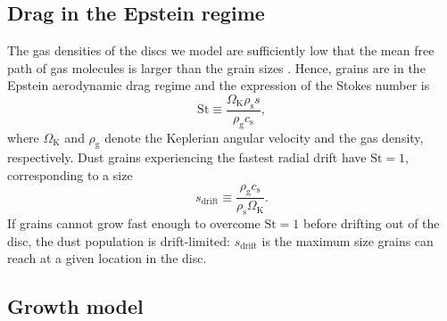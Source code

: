 \documentclass[a4paper,fleqn,usenatbib]{mnras}
\newcommand{\St}{\mathrm{St}}         %
\begin{document}
\subsection{Drag in the Epstein regime}
\label{sec:Drag}

The gas densities of the discs we model are sufficiently low that the mean free path of gas molecules is larger than the grain sizes \citep{Laibe2012}. Hence, grains are in the Epstein aerodynamic drag regime and the expression of the Stokes number is
\begin{equation}
\St \equiv \frac{\Omega_\mathrm{K}\rho_\mathrm{s}s}{\rho_\mathrm{g}c_\mathrm{s}},
\label{Eq:St}
\end{equation}
where $\Omega_\mathrm{K}$ and $\rho_\mathrm{g}$ denote the Keplerian angular velocity and the gas density, respectively.
Dust grains experiencing the fastest radial drift have $\St = 1$, corresponding to a size
\begin{equation}
s_\mathrm{drift} \equiv \frac{\rho_\mathrm{g}c_\mathrm{s}}{\rho_\mathrm{s}\Omega_\mathrm{K}}.
\label{Eq:s_drift}
\end{equation}
If grains cannot grow fast enough to overcome $\St=1$ before drifting out of the disc, the dust population is drift-limited: $s_\mathrm{drift}$ is the maximum size grains can reach at a given location in the disc.

\subsection{Growth model}
\label{sec:Growth}
\end{document}
